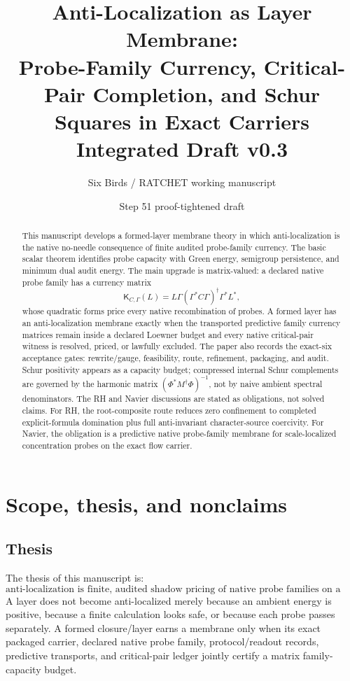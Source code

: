 \documentclass[11pt]{article}
\title{Anti-Localization as Layer Membrane:\\
Probe-Family Currency, Critical-Pair Completion, and Schur Squares in Exact Carriers\\
\large Integrated Draft v0.3}
\author{Six Birds / RATCHET working manuscript}
\date{Step 51 proof-tightened draft}
\newcommand{\K}{\mathsf K}
\begin{document}
\maketitle

\begin{abstract}
This manuscript develops a formed-layer membrane theory in which anti-localization is the native no-needle consequence of finite audited probe-family currency.  The basic scalar theorem identifies probe capacity with Green energy, semigroup persistence, and minimum dual audit energy.  The main upgrade is matrix-valued: a declared native probe family has a currency matrix
\[
  \K_{C,\Gamma}(L)=L\Gamma(\Gamma^*C\Gamma)^\dagger\Gamma^*L^*,
\]
whose quadratic forms price every native recombination of probes.  A formed layer has an anti-localization membrane exactly when the transported predictive family currency matrices remain inside a declared Loewner budget and every native critical-pair witness is resolved, priced, or lawfully excluded.  The paper also records the exact-six acceptance gates: rewrite/gauge, feasibility, route, refinement, packaging, and audit.  Schur positivity appears as a capacity budget; compressed internal Schur complements are governed by the harmonic matrix \((\Phi^*M^\dagger\Phi)^{-1}\), not by naive ambient spectral denominators.  The RH and Navier discussions are stated as obligations, not solved claims.  For RH, the root-composite route reduces zero confinement to completed explicit-formula domination plus full anti-invariant character-source coercivity.  For Navier, the obligation is a predictive native probe-family membrane for scale-localized concentration probes on the exact flow carrier.
\end{abstract}

\tableofcontents

\section{Scope, thesis, and nonclaims}

\subsection{Thesis}
The thesis of this manuscript is:
\[
\boxed{\text{anti-localization is finite, audited shadow pricing of native probe families on a formed layer.}}
\]
A layer does not become anti-localized merely because an ambient energy is positive, because a finite calculation looks safe, or because each probe passes separately.  A formed closure/layer earns a membrane only when its exact packaged carrier, declared native probe family, protocol/readout records, predictive transports, and critical-pair ledger jointly certify a matrix family-capacity budget.
\end{document}
